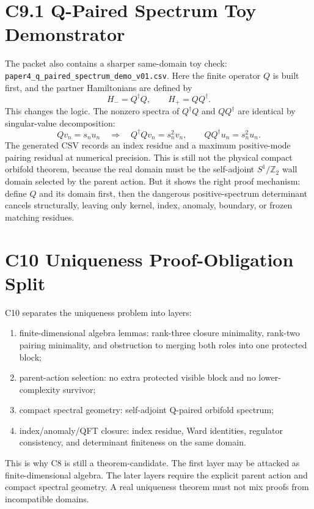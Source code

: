 \documentclass[11pt]{article}
\begin{document}
\section{C9.1 Q-Paired Spectrum Toy Demonstrator}
The packet also contains a sharper same-domain toy check:
\texttt{paper4\_q\_paired\_spectrum\_demo\_v01.csv}.  Here the finite
operator $Q$ is built first, and the partner Hamiltonians are defined by
\begin{equation}
H_-=Q^\dagger Q,\qquad H_+=QQ^\dagger .
\end{equation}
This changes the logic.  The nonzero spectra of $Q^\dagger Q$ and $QQ^\dagger$
are identical by singular-value decomposition:
\begin{equation}
Qv_n=s_nu_n
\quad\Longrightarrow\quad
Q^\dagger Qv_n=s_n^2v_n,\qquad
QQ^\dagger u_n=s_n^2u_n .
\end{equation}
The generated CSV records an index residue and a maximum positive-mode pairing
residual at numerical precision.  This is still not the physical compact
orbifold theorem, because the real domain must be the self-adjoint
$S^1/\mathbb Z_2$ wall domain selected by the parent action.  But it shows the
right proof mechanism: define $Q$ and its domain first, then the dangerous
positive-spectrum determinant cancels structurally, leaving only kernel,
index, anomaly, boundary, or frozen matching residues.

\section{C10 Uniqueness Proof-Obligation Split}
C10 separates the uniqueness problem into layers:
\begin{enumerate}
\item finite-dimensional algebra lemmas: rank-three closure minimality,
rank-two pairing minimality, and obstruction to merging both roles into one
protected block;
\item parent-action selection: no extra protected visible block and no
lower-complexity survivor;
\item compact spectral geometry: self-adjoint Q-paired orbifold spectrum;
\item index/anomaly/QFT closure: index residue, Ward identities, regulator
consistency, and determinant finiteness on the same domain.
\end{enumerate}
This is why C8 is still a theorem-candidate.  The first layer may be attacked
as finite-dimensional algebra.  The later layers require the explicit parent
action and compact spectral geometry.  A real uniqueness theorem must not mix
proofs from incompatible domains.
\end{document}
